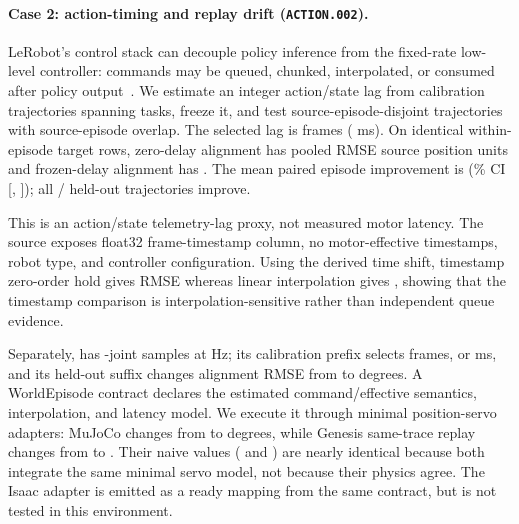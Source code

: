 \paragraph{Case 2: action-timing and replay drift (\texttt{ACTION.002}).}
LeRobot's control stack can decouple policy inference from the fixed-rate low-level controller:
commands may be queued, chunked, interpolated, or consumed after policy output~\citep{lerobot}.
We estimate an integer action/state lag from \ExpTimingCalibrationEpisodes{} calibration
trajectories spanning \ExpTimingTaskCount{} tasks, freeze it, and test
\ExpTimingHeldoutEpisodes{} source-episode-disjoint trajectories with
\ExpTimingSourceEpisodeOverlap{} source-episode overlap.
The selected lag is \ExpTimingDelayFrames{} frames (\ExpTimingDelayMilliseconds{} ms). On identical
within-episode target rows, zero-delay alignment has pooled RMSE \ExpTimingZeroRmse{} source
position units and frozen-delay alignment has \ExpTimingFrozenRmse{}. The mean paired episode
improvement is \ExpTimingImprovement{} (\ExpConfidencePercent\% CI
[\ExpTimingImprovementCiLow, \ExpTimingImprovementCiHigh]); all
\ExpTimingImprovedEpisodeCount/\ExpTimingHeldoutEpisodes{} held-out trajectories improve.

This is an action/state telemetry-lag proxy, not measured motor latency. The source exposes
\ExpTimingTimestampColumnCount{} float32 frame-timestamp column, no motor-effective timestamps,
\ExpTimingRobotTypeCount{} robot type, and \ExpTimingControllerConfigurationCount{} controller
configuration.
Using the derived time shift, timestamp zero-order hold gives \ExpTimingTimestampZohRmse{} RMSE
whereas linear interpolation gives \ExpTimingTimestampLinearRmse{}, showing that the timestamp
comparison is interpolation-sensitive rather than independent queue evidence.

Separately, \ExpReplayTraceCount{} \ExpReplayTraceNoun{} has \ExpReplaySampleCount{}
\ExpReplayJointCount-joint samples at
\ExpReplayRateHz{} Hz; its calibration prefix selects \ExpReplayDelayFrames{} frames, or
\ExpReplayDelayMilliseconds{} ms, and its held-out suffix changes alignment RMSE from
\ExpAlignmentNaiveRmse{} to \ExpAlignmentTimedRmse{} degrees. A WorldEpisode contract declares the
estimated command/effective semantics, interpolation, and latency model. We execute it through
\ExpReplayTestedSimulatorCount{} minimal position-servo adapters: MuJoCo changes from
\ExpMujocoNaiveRmse{} to \ExpMujocoTimedRmse{} degrees, while Genesis same-trace replay changes
from \ExpGenesisNaiveRmse{} to \ExpGenesisTimedRmse{}. Their naive values
(\ExpMujocoNaiveRmsePrecise{} and \ExpGenesisNaiveRmsePrecise{}) are nearly identical because both
integrate the same minimal servo model, not because their physics agree. The Isaac adapter is
emitted as a ready mapping from the same contract, but is not tested in this environment.

